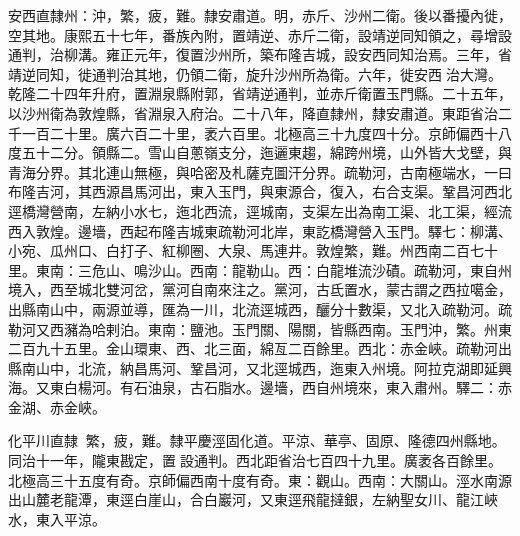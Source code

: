 \begin{pinyinscope}
安西直隸州：沖，繁，疲，難。隸安肅道。明，赤斤、沙州二衛。後以番擾內徙，空其地。康熙五十七年，番族內附，置靖逆、赤斤二衛，設靖逆同知領之，尋增設通判，治柳溝。雍正元年，復置沙州所，築布隆吉城，設安西同知治焉。三年，省靖逆同知，徙通判治其地，仍領二衛，旋升沙州所為衛。六年，徙安西治大灣。乾隆二十四年升府，置淵泉縣附郭，省靖逆通判，並赤斤衛置玉門縣。二十五年，以沙州衛為敦煌縣，省淵泉入府治。二十八年，降直隸州，隸安肅道。東距省治二千一百二十里。廣六百二十里，袤六百里。北極高三十九度四十分。京師偏西十八度五十二分。領縣二。雪山自蔥嶺支分，迤邐東趨，綿跨州境，山外皆大戈壁，與青海分界。其北連山無極，與哈密及札薩克圖汗分界。疏勒河，古南極端水，一曰布隆吉河，其西源昌馬河出，東入玉門，與東源合，復入，右合支渠。鞏昌河西北逕橋灣營南，左納小水七，迤北西流，逕城南，支渠左出為南工渠、北工渠，經流西入敦煌。邊墻，西起布隆吉城東疏勒河北岸，東訖橋灣營入玉門。驛七：柳溝、小宛、瓜州口、白打子、紅柳圈、大泉、馬連井。敦煌繁，難。州西南二百七十里。東南：三危山、鳴沙山。西南：龍勒山。西：白龍堆流沙磧。疏勒河，東自州境入，西至城北雙河岔，黨河自南來注之。黨河，古氐置水，蒙古謂之西拉噶金，出縣南山中，兩源並導，匯為一川，北流逕城西，釃分十數渠，又北入疏勒河。疏勒河又西瀦為哈剌泊。東南：鹽池。玉門關、陽關，皆縣西南。玉門沖，繁。州東二百九十五里。金山環東、西、北三面，綿亙二百餘里。西北：赤金峽。疏勒河出縣南山中，北流，納昌馬河、鞏昌河，又北逕城西，迤東入州境。阿拉克湖即延興海。又東白楊河。有石油泉，古石脂水。邊墻，西自州境來，東入肅州。驛二：赤金湖、赤金峽。

化平川直隸：繁，疲，難。隸平慶涇固化道。平涼、華亭、固原、隆德四州縣地。同治十一年，隴東戡定，置設通判。西北距省治七百四十九里。廣袤各百餘里。北極高三十五度有奇。京師偏西南十度有奇。東：觀山。西南：大關山。涇水南源出山麓老龍潭，東逕白崖山，合白巖河，又東逕飛龍撻銀，左納聖女川、龍江峽水，東入平涼。


\end{pinyinscope}